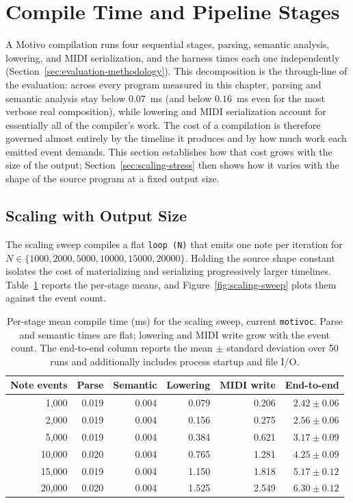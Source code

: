 \section{Compile Time and Pipeline Stages}\label{sec:compile-time}

A Motivo compilation runs four sequential stages, parsing, semantic analysis, lowering, and MIDI serialization, and the
harness times each one independently (Section~\ref{sec:evaluation-methodology}).
This decomposition is the through-line of the evaluation: across every program measured in this chapter, parsing and
semantic analysis stay below $0.07$~ms (and below $0.16$~ms even for the most verbose real composition), while lowering
and MIDI serialization account for essentially all of the compiler's work.
The cost of a compilation is therefore governed almost entirely by the timeline it produces and by how much work each
emitted event demands.
This section establishes how that cost grows with the size of the output; Section~\ref{sec:scaling-stress} then shows
how it varies with the shape of the source program at a fixed output size.

\subsection{Scaling with Output Size}\label{detail-subsec:scaling-sweep}

The scaling sweep compiles a flat \texttt{loop (N)} that emits one note per iteration for
$N \in \{1000, 2000, 5000, 10000, 15000, 20000\}$.
Holding the source shape constant isolates the cost of materializing and serializing progressively larger timelines.
Table~\ref{tab:scaling-stages} reports the per-stage means, and Figure~\ref{fig:scaling-sweep} plots them against the
event count.

\begin{table}[htbp]
  \centering
  \footnotesize
  \renewcommand{\arraystretch}{1.25}
  \begin{tabular}{rrrrrr}
    \toprule
    \textbf{Note events} & \textbf{Parse} & \textbf{Semantic} & \textbf{Lowering} & \textbf{MIDI write} &
    \textbf{End-to-end} \\
    \midrule
    1,000 & 0.019 & 0.004 & 0.079 & 0.206 & $2.42 \pm 0.06$ \\
    2,000 & 0.019 & 0.004 & 0.156 & 0.275 & $2.56 \pm 0.06$ \\
    5,000 & 0.019 & 0.004 & 0.384 & 0.621 & $3.17 \pm 0.09$ \\
    10,000 & 0.020 & 0.004 & 0.765 & 1.281 & $4.25 \pm 0.09$ \\
    15,000 & 0.019 & 0.004 & 1.150 & 1.818 & $5.17 \pm 0.12$ \\
    20,000 & 0.020 & 0.004 & 1.525 & 2.549 & $6.30 \pm 0.12$ \\
    \bottomrule
  \end{tabular}
  \caption{Per-stage mean compile time (ms) for the scaling sweep, current \texttt{motivoc}. Parse and semantic times
    are flat; lowering and MIDI write grow with the event count. The end-to-end column reports the mean $\pm$ standard
  deviation over 50 runs and additionally includes process startup and file I/O.}\label{tab:scaling-stages}
\end{table}

